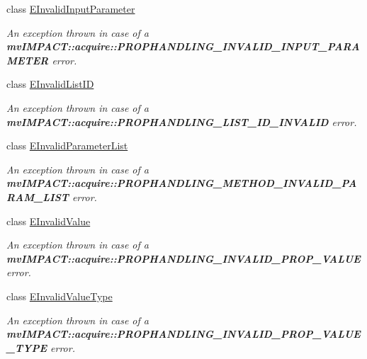 \begin{DoxyCompactItemize}
class \hyperlink{classmv_i_m_p_a_c_t_1_1acquire_1_1_e_invalid_input_parameter}{E\+Invalid\+Input\+Parameter}
\begin{DoxyCompactList}\small\item\em An exception thrown in case of a {\bfseries mv\+I\+M\+P\+A\+C\+T\+::acquire\+::\+P\+R\+O\+P\+H\+A\+N\+D\+L\+I\+N\+G\+\_\+\+I\+N\+V\+A\+L\+I\+D\+\_\+\+I\+N\+P\+U\+T\+\_\+\+P\+A\+R\+A\+M\+E\+T\+E\+R} error. \end{DoxyCompactList}\item 
class \hyperlink{classmv_i_m_p_a_c_t_1_1acquire_1_1_e_invalid_list_i_d}{E\+Invalid\+List\+I\+D}
\begin{DoxyCompactList}\small\item\em An exception thrown in case of a {\bfseries mv\+I\+M\+P\+A\+C\+T\+::acquire\+::\+P\+R\+O\+P\+H\+A\+N\+D\+L\+I\+N\+G\+\_\+\+L\+I\+S\+T\+\_\+\+I\+D\+\_\+\+I\+N\+V\+A\+L\+I\+D} error. \end{DoxyCompactList}\item 
class \hyperlink{classmv_i_m_p_a_c_t_1_1acquire_1_1_e_invalid_parameter_list}{E\+Invalid\+Parameter\+List}
\begin{DoxyCompactList}\small\item\em An exception thrown in case of a {\bfseries mv\+I\+M\+P\+A\+C\+T\+::acquire\+::\+P\+R\+O\+P\+H\+A\+N\+D\+L\+I\+N\+G\+\_\+\+M\+E\+T\+H\+O\+D\+\_\+\+I\+N\+V\+A\+L\+I\+D\+\_\+\+P\+A\+R\+A\+M\+\_\+\+L\+I\+S\+T} error. \end{DoxyCompactList}\item 
class \hyperlink{classmv_i_m_p_a_c_t_1_1acquire_1_1_e_invalid_value}{E\+Invalid\+Value}
\begin{DoxyCompactList}\small\item\em An exception thrown in case of a {\bfseries mv\+I\+M\+P\+A\+C\+T\+::acquire\+::\+P\+R\+O\+P\+H\+A\+N\+D\+L\+I\+N\+G\+\_\+\+I\+N\+V\+A\+L\+I\+D\+\_\+\+P\+R\+O\+P\+\_\+\+V\+A\+L\+U\+E} error. \end{DoxyCompactList}\item 
class \hyperlink{classmv_i_m_p_a_c_t_1_1acquire_1_1_e_invalid_value_type}{E\+Invalid\+Value\+Type}
\begin{DoxyCompactList}\small\item\em An exception thrown in case of a {\bfseries mv\+I\+M\+P\+A\+C\+T\+::acquire\+::\+P\+R\+O\+P\+H\+A\+N\+D\+L\+I\+N\+G\+\_\+\+I\+N\+V\+A\+L\+I\+D\+\_\+\+P\+R\+O\+P\+\_\+\+V\+A\+L\+U\+E\+\_\+\+T\+Y\+P\+E} error. \end{DoxyCompactList}\item 

\end{DoxyCompactItemize}
